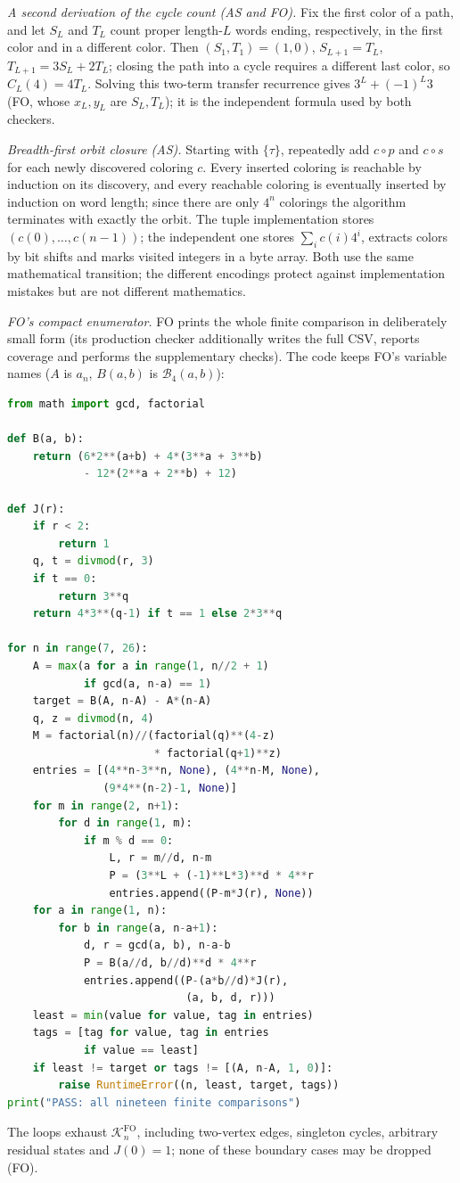 \documentclass[11pt,a4paper]{article}
\numberwithin{equation}{section}
\theoremstyle{definition}
\theoremstyle{remark}
\newcommand{\Bip}{\mathcal B}
\begin{document}
\emph{A second derivation of the cycle count (AS and FO).} Fix the first color
of a path, and let $S_L$ and $T_L$ count proper length-$L$ words ending,
respectively, in the first color and in a different color. Then
$(S_1,T_1)=(1,0)$, $S_{L+1}=T_L$, $T_{L+1}=3S_L+2T_L$; closing the path into a
cycle requires a different last color, so $C_L(4)=4T_L$. Solving this
two-term transfer recurrence gives $3^L+(-1)^L3$ (FO, whose $x_L,y_L$ are
$S_L,T_L$); it is the independent formula used by both checkers.

\emph{Breadth-first orbit closure (AS).} Starting with $\{\tau\}$, repeatedly
add $c\circ p$ and $c\circ s$ for each newly discovered coloring $c$. Every
inserted coloring is reachable by induction on its discovery, and every
reachable coloring is eventually inserted by induction on word length; since
there are only $4^n$ colorings the algorithm terminates with exactly the orbit.
The tuple implementation stores $(c(0),\ldots,c(n-1))$; the independent one
stores $\sum_ic(i)4^i$, extracts colors by bit shifts and marks visited integers
in a byte array. Both use the same mathematical transition; the different
encodings protect against implementation mistakes but are not different
mathematics.

\emph{FO's compact enumerator.} FO prints the whole finite comparison in
deliberately small form (its production checker additionally writes the full
CSV, reports coverage and performs the supplementary checks). The code keeps
FO's variable names ($A$ is $a_n$, $B(a,b)$ is $\Bip_4(a,b)$):
\begin{lstlisting}[language=Python]
from math import gcd, factorial

def B(a, b):
    return (6*2**(a+b) + 4*(3**a + 3**b)
            - 12*(2**a + 2**b) + 12)

def J(r):
    if r < 2:
        return 1
    q, t = divmod(r, 3)
    if t == 0:
        return 3**q
    return 4*3**(q-1) if t == 1 else 2*3**q

for n in range(7, 26):
    A = max(a for a in range(1, n//2 + 1)
            if gcd(a, n-a) == 1)
    target = B(A, n-A) - A*(n-A)
    q, z = divmod(n, 4)
    M = factorial(n)//(factorial(q)**(4-z)
                       * factorial(q+1)**z)
    entries = [(4**n-3**n, None), (4**n-M, None),
               (9*4**(n-2)-1, None)]
    for m in range(2, n+1):
        for d in range(1, m):
            if m % d == 0:
                L, r = m//d, n-m
                P = (3**L + (-1)**L*3)**d * 4**r
                entries.append((P-m*J(r), None))
    for a in range(1, n):
        for b in range(a, n-a+1):
            d, r = gcd(a, b), n-a-b
            P = B(a//d, b//d)**d * 4**r
            entries.append((P-(a*b//d)*J(r),
                            (a, b, d, r)))
    least = min(value for value, tag in entries)
    tags = [tag for value, tag in entries
            if value == least]
    if least != target or tags != [(A, n-A, 1, 0)]:
        raise RuntimeError((n, least, target, tags))
print("PASS: all nineteen finite comparisons")
\end{lstlisting}
The loops exhaust $\mathcal K^{\mathrm{FO}}_n$, including two-vertex edges,
singleton cycles, arbitrary residual states and $J(0)=1$; none of these
boundary cases may be dropped (FO).
\end{document}

